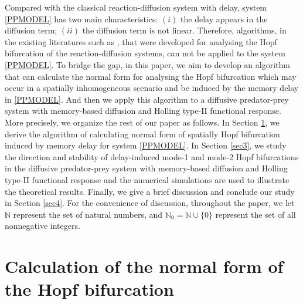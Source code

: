 \documentclass[11pt]{article}
\theoremstyle{definition}
\theoremstyle{remark}
\numberwithin{equation}{section}
\begin{document}
Compared with the classical reaction-diffusion system with delay,  system \eqref{PPMODEL} has two main characteristics: $(i)$ the delay appears in the diffusion term; $(ii)$ the diffusion term is not linear.   Therefore, algorithms,  in the existing literatures such as \cite{Hassard-book,Faria-00TAMS,Wu-Song-CNSNS2020,Song-Shi-2021},  that were developed for analysing the Hopf bifurcation of the reaction-diffusion systems, can not be applied to the system \eqref{PPMODEL}. To bridge the gap, in this paper, we aim to develop an algorithm that can calculate the normal form for analysing the Hopf bifurcation which may occur in a spatially inhomogeneous scenario and be induced by the memory delay in \eqref{PPMODEL}. And then we apply this algorithm to a diffusive predator-prey system with memory-based diffusion and Holling type-II functional response. More precisely, we organize the rest of our paper as follows.
 In Section \ref{sec2}, we derive the algorithm of calculating normal form of spatially Hopf bifurcation  induced by memory delay for system \eqref{PPMODEL}.   In Section \ref{sec3}, we study  the direction and stability of delay-induced mode-1 and mode-2 Hopf bifurcations in the diffusive predator-prey system with memory-based diffusion and Holling type-II functional response and the numerical simulations are used to illustrate the theoretical results. Finally,  we give a brief discussion and conclude our study in Section \ref{sec4}. For the convenience of discussion, throughout the paper, we let $\mathbb{N}$ represent the set of natural numbers, and $\mathbb{N}_0=\mathbb{N}\cup \{0\}$ represent the set of all nonnegative integers.


\section{Calculation of the normal form of the Hopf bifurcation}\label{sec2}
\end{document}
